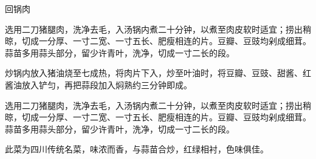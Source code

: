 \begin{recipe}{回锅肉}

\begin{ingredients}
\end{ingredients}

\begin{method}
\item 选用二刀猪腿肉，洗净去毛，入汤锅内煮二十分钟，以煮至肉皮软时适宜；捞出稍晾，切成一分厚、一寸二宽、一寸五长、肥瘦相连的片。豆瓣、豆豉均剁成细茸。蒜苗多用蒜头部分，留少许青叶，洗净，切成一寸二长的段。
\item 炒锅内放入猪油烧至七成热，将肉片下入，炒至叶油时，将豆瓣、豆豉、甜酱、红酱油放入铲匀，再把蒜段加入焖熟约三分钟即成。
\item 选用二刀猪腿肉，洗净去毛，入汤锅内煮二十分钟，以煮至肉皮软时适宜；捞出稍晾，切成一分厚、一寸二宽、一寸五长、肥瘦相连的片。豆瓣、豆豉均剁成细茸。蒜苗多用蒜头部分，留少许青叶，洗净，切成一寸二长的段。
\end{method}

\begin{note}
此菜为四川传统名菜，味浓而香，与蒜苗合炒，红绿相衬，色味俱佳。
\end{note}

\end{recipe}

